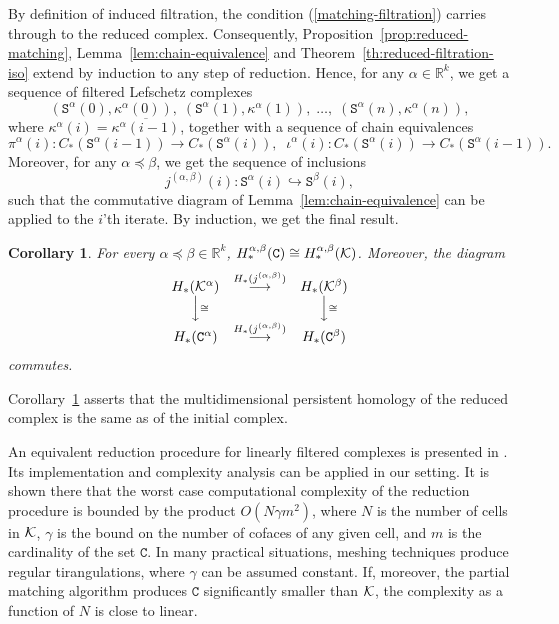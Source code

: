 \documentclass[12pt]{article}
\newtheorem{cor}[thm]{Corollary}
\newcommand{\R}{{\mathbb R}}
\newcommand{\cK}{{\cal K}}
\def\mapright#1{\stackrel{#1}{\longrightarrow}}
\def\mapdown#1{\Big\downarrow\rlap{$\vcenter{\hbox{$\scriptstyle#1$}}$}}
\newcommand{\sS}{\texttt{S}} \newcommand{\sA}{\texttt{A}}
\newcommand{\sC}{\texttt{C}} \newcommand{\sD}{\texttt{D}} \newcommand{\sM}{\texttt{M}} \newcommand{\sL}{\texttt{L}}
\begin{document}
By definition of induced filtration, the condition (\ref{matching-filtration}) carries through to the reduced complex. Consequently, Proposition~\ref{prop:reduced-matching}, Lemma~\ref{lem:chain-equivalence} and Theorem~\ref{th:reduced-filtration-iso} extend by induction to any step of reduction. Hence, for any $\alpha\in \R^k$,  we get a sequence of filtered Lefschetz complexes
\[
(\sS^{\alpha}(0),\kappa^{\alpha}(0)),\; (\sS^{\alpha}(1),\kappa^{\alpha}(1)),\;\ldots,\;(\sS^{\alpha}(n),\kappa^{\alpha}(n)),
\]
where $\kappa^{\alpha}(i)=\overline{\kappa^{\alpha}(i-1)}$, together with a sequence of chain equivalences
\[
\pi^{\alpha}(i): C_*(\sS^{\alpha}(i-1))\to C_*(\sS^{\alpha}(i)),\;\;\iota^{\alpha}(i): C_*(\sS^{\alpha}(i))\to C_*(\sS^{\alpha}(i-1)).
\]
Moreover, for any $\alpha\preceq \beta$, we get the sequence of inclusions
\[
j^{(\alpha,\beta)}(i):\sS^{\alpha}(i)\hookrightarrow \sS^{\beta}(i),
\]
such that the commutative diagram of Lemma~\ref{lem:chain-equivalence} can be applied to the $i$'th iterate. By induction, we get the final result.

\medskip

\begin{cor}\label{cor:homology-S-iso-C}
For every $\alpha\preceq \beta\in \R^k$, $H_*^{\alpha,\beta}(\sC) \cong  H_*^{\alpha,\beta}(\cK)$.
Moreover, the diagram
\[
\begin{array}{ccc}
H_*(\cK^\alpha) & \mapright{H_*(j^{(\alpha,\beta)})} & H_*(\cK^\beta) \\
\mapdown{\cong} & & \mapdown{\cong} \\
H_*(\sC^\alpha) & \mapright{H_*(j^{(\alpha,\beta)})} & H_*(\sC^\beta)
\end{array}
\]
commutes.
\end{cor}

Corollary~\ref{cor:homology-S-iso-C} asserts that the multidimensional persistent homology of the reduced complex is the same as of the initial complex.

An equivalent reduction procedure for linearly filtered complexes is presented in \cite{MiNa}. Its implementation and complexity analysis can be applied in our setting. It is shown there that the worst case computational complexity of the reduction procedure is bounded by the product $O(N \gamma m^2)$, where $N$ is the number of cells in $\cK$, $\gamma$ is the bound on the number of cofaces of any given cell, and $m$ is the cardinality of the set $\sC$. In many practical situations, meshing techniques produce regular tirangulations, where $\gamma$ can be assumed constant. If, moreover, the partial matching algorithm produces $\sC$ significantly smaller than $\cK$, the complexity as a function of $N$ is close to linear.
\end{document}
